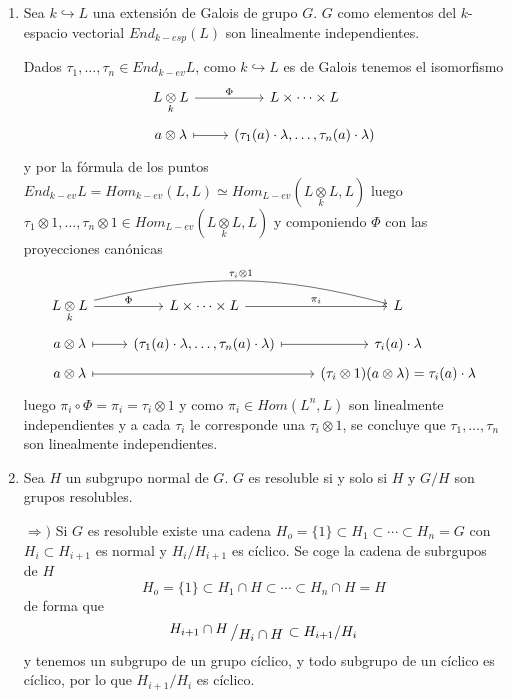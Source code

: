 \begin{enumerate}
\begin{dem}
        Por tanto, 
        $$\dim_k L = |Aut_{L'}L| = |Aut_{L^G} L | = ?? |G| \qquad \text{y} \qquad \dim_k L = |G|$$
        y por la f\'ormula de la dimensi\'on de varias extensiones encadenadas,
        $$|G| = \dim_k L = \dim_k L' \cdot \dim_{L'} L =\dim_k L^G \cdot |G| \Rightarrow \dim_k L^G = 1 \Rightarrow L^G = k  $$
    \end{dem}
    \item Sea $k \hookrightarrow L$ una extensi\'on de Galois de grupo $G$. $G$ como elementos del $k$-espacio vectorial $End_{k-esp}(L)$ son linealmente independientes.
    \begin{dem}
        Dados $\tau_1, \ldots, \tau_n \in End_{k-ev}L$, como $k \hookrightarrow L$ es de Galois tenemos el isomorfismo 
        $$\bt L \underset{k}{\otimes} L \rar{\Phi} & L \times \cdots \times L \\[-5mm] a\otimes \lambda \rarmaps & (\tau_1(a) \cdot \lambda, \ldots, \tau_n(a) \cdot \lambda) \et$$
        y por la f\'ormula de los puntos $End_{k-ev}L = Hom_{k-ev}(L,L) \simeq Hom_{L-ev}(L \underset{k}{\otimes} L, L)$ luego $\tau_1\otimes 1, \ldots, \tau_n\otimes 1 \in Hom_{L-ev}(L \underset{k}{\otimes} L, L)$ y componiendo $\Phi$ con las proyecciones can\'onicas
        $$\bt L \underset{k}{\otimes} L \arrow[bend left=5mm]{rr}{\tau_i \otimes 1} \rar{\Phi} & L \times \cdots \times L \rar{\pi_i} & L \\[-5mm] a \otimes \lambda \rarmaps & (\tau_1(a) \cdot \lambda, \ldots, \tau_n(a) \cdot \lambda) \rarmaps & \tau_i(a) \cdot \lambda \\ [-5mm] a \otimes \lambda \arrow[mapsto]{rr} & & (\tau_i \otimes 1)(a \otimes \lambda) = \tau_i(a) \cdot \lambda  \et$$
         luego $\pi_i \circ \Phi =\pi_i =\tau_i \otimes 1$ y como $\pi_i\in Hom(L^n, L)$ son linealmente independientes y a cada $\tau_i$ le corresponde una $\tau_i\otimes 1$, se concluye que $\tau_1, \ldots, \tau_n$ son linealmente independientes.
    \end{dem}
    \item Sea $H$ un subgrupo normal de $G$. $G$ es resoluble si y solo si $H$ y $G/H$ son grupos resolubles.
    \begin{dem}
    $\Rightarrow)$ Si $G$ es resoluble existe una cadena $H_o = \{1\} \subset H_1 \subset \cdots \subset H_n = G$ con $H_i \subset H_{i+1}$ es normal y $H_i / H_{i+1}$ es c\'iclico. Se coge la cadena de subrgupos de $H$
    $$H_o = \{1\} \subset H_1 \cap H \subset \cdots \subset H_n \cap H= H$$
     de forma que 
     $$\modulo{H_{i+1} \cap H}{H_i \cap H} \subset H_{i+1}/H_i$$
     y tenemos un subgrupo de un grupo c\'iclico, y todo subgrupo de un c\'iclico es c\'iclico, por lo que $H_{i+1}/H_i$ es c\'iclico. 


\end{dem}
\end{enumerate}
